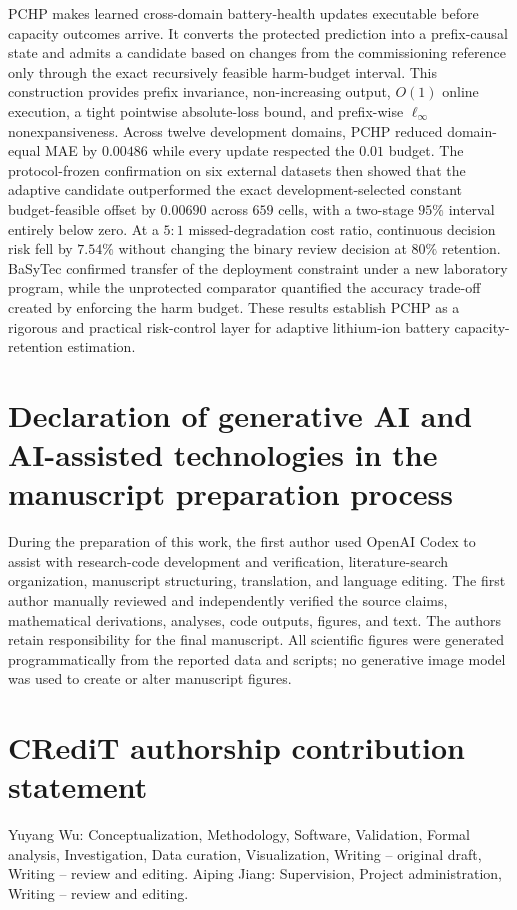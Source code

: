 \documentclass[preprint,12pt]{elsarticle}
\begin{document}
PCHP makes learned cross-domain battery-health updates executable before capacity outcomes arrive. It converts the protected prediction into a prefix-causal state and admits a candidate based on changes from the commissioning reference only through the exact recursively feasible harm-budget interval. This construction provides prefix invariance, non-increasing output, $O(1)$ online execution, a tight pointwise absolute-loss bound, and prefix-wise $\ell_\infty$ nonexpansiveness. Across twelve development domains, PCHP reduced domain-equal MAE by $0.00486$ while every update respected the $0.01$ budget. The protocol-frozen confirmation on six external datasets then showed that the adaptive candidate outperformed the exact development-selected constant budget-feasible offset by $0.00690$ across $659$ cells, with a two-stage $95\%$ interval entirely below zero. At a $5{:}1$ missed-degradation cost ratio, continuous decision risk fell by $7.54\%$ without changing the binary review decision at $80\%$ retention. BaSyTec confirmed transfer of the deployment constraint under a new laboratory program, while the unprotected comparator quantified the accuracy trade-off created by enforcing the harm budget. These results establish PCHP as a rigorous and practical risk-control layer for adaptive lithium-ion battery capacity-retention estimation.

\section*{Declaration of generative AI and AI-assisted technologies in the manuscript preparation process}

During the preparation of this work, the first author used OpenAI Codex to assist with research-code development and verification, literature-search organization, manuscript structuring, translation, and language editing. The first author manually reviewed and independently verified the source claims, mathematical derivations, analyses, code outputs, figures, and text. The authors retain responsibility for the final manuscript. All scientific figures were generated programmatically from the reported data and scripts; no generative image model was used to create or alter manuscript figures.

\section*{CRediT authorship contribution statement}

Yuyang Wu: Conceptualization, Methodology, Software, Validation, Formal analysis, Investigation, Data curation, Visualization, Writing -- original draft, Writing -- review and editing. Aiping Jiang: Supervision, Project administration, Writing -- review and editing.
\end{document}
